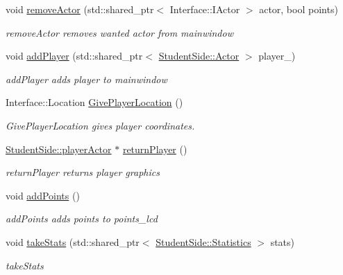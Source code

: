 \begin{DoxyCompactItemize}
void \hyperlink{class_student_side_1_1_mainwindow_ada6a000c4e9218c72425bad298e17ed9}{remove\-Actor} (std\-::shared\-\_\-ptr$<$ Interface\-::\-I\-Actor $>$ actor, bool points)
\begin{DoxyCompactList}\small\item\em remove\-Actor removes wanted actor from mainwindow \end{DoxyCompactList}\item 
void \hyperlink{class_student_side_1_1_mainwindow_ad97e4d9dd00a8d0b2b377f749504f98a}{add\-Player} (std\-::shared\-\_\-ptr$<$ \hyperlink{class_student_side_1_1_actor}{Student\-Side\-::\-Actor} $>$ player\-\_\-)
\begin{DoxyCompactList}\small\item\em add\-Player adds player to mainwindow \end{DoxyCompactList}\item 
Interface\-::\-Location \hyperlink{class_student_side_1_1_mainwindow_a487fd2b55286ec6c538c9bfbf8055dfb}{Give\-Player\-Location} ()
\begin{DoxyCompactList}\small\item\em Give\-Player\-Location gives player coordinates. \end{DoxyCompactList}\item 
\hyperlink{class_student_side_1_1player_actor}{Student\-Side\-::player\-Actor} $\ast$ \hyperlink{class_student_side_1_1_mainwindow_aa1eb590a67e0a49fd493c25ec20d189c}{return\-Player} ()
\begin{DoxyCompactList}\small\item\em return\-Player returns player graphics \end{DoxyCompactList}\item 
void \hyperlink{class_student_side_1_1_mainwindow_aed59f49514fa33ffdb6b77b0d0aa54f7}{add\-Points} ()
\begin{DoxyCompactList}\small\item\em add\-Points adds points to points\-\_\-lcd \end{DoxyCompactList}\item 
void \hyperlink{class_student_side_1_1_mainwindow_afa7eb3e3a86fab995d90d253015d3dc7}{take\-Stats} (std\-::shared\-\_\-ptr$<$ \hyperlink{class_student_side_1_1_statistics}{Student\-Side\-::\-Statistics} $>$ stats)
\begin{DoxyCompactList}\small\item\em take\-Stats \end{DoxyCompactList}\item 

\end{DoxyCompactItemize}
